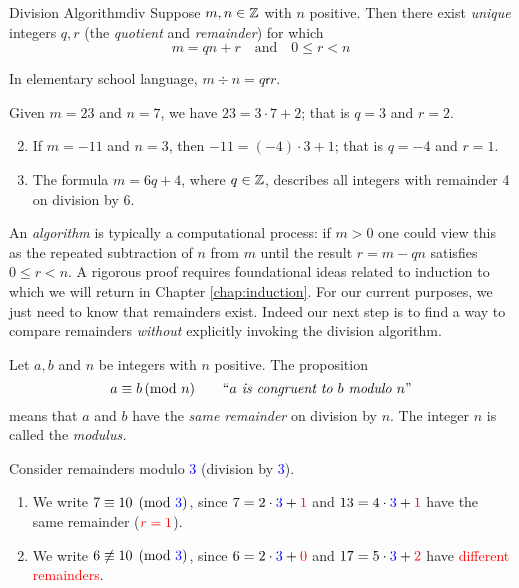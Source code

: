 \begin{thm}{Division Algorithm}{div}
	Suppose $m,n\in\mathbb{Z}$ with $n$ positive. Then there exist \emph{unique} integers $q,r$ (the \emph{quotient} and \emph{remainder}) for which
	\[
		m=qn+r\quad\text{and}\quad 0\le r<n
	\]
\end{thm}


In elementary school language, $m\div n=q\mathbin{\mathsf r}r$.

\begin{examples}{}{}
	\exstart Given $m=23$ and $n=7$, we have $23=3\cdot 7+2$; that is $q=3$ and $r=2$.
	\begin{enumerate}\setcounter{enumi}{1}
		\item If $m=-11$ and $n=3$, then $-11=(-4)\cdot 3+1$; that is $q=-4$ and $r=1$.
		\item The formula $m=6q+4$, where $q\in\mathbb{Z}$, describes all integers with remainder 4 on division by 6.
	\end{enumerate}
\end{examples}

An \emph{algorithm} is typically a computational process: if $m>0$ one could view this as the repeated subtraction of $n$ from $m$ until the result $r=m-qn$ satisfies $0\le r<n$. A rigorous proof requires foundational ideas related to induction to which we will return in Chapter \ref{chap:induction}. For our current purposes, we just need to know that remainders exist. Indeed our next step is to find a way to compare remainders \emph{without} explicitly invoking the division algorithm.


\begin{defn}{}{}
	Let $a,b$ and $n$ be integers with $n$ positive. The proposition
	\[
		a\equiv b\negthickspace\pmod{n}\qquad \text{``\emph{$a$ is congruent to $b$ modulo $n$}''}
	\]
	means that $a$ and $b$ have the \emph{same remainder} on division by $n$. The integer $n$ is called the \emph{modulus.}
\end{defn}

\begin{examples}{}{}
	Consider remainders modulo \textcolor{blue}{3} (division by \textcolor{blue}{3}).
	\begin{enumerate}\itemsep1pt
	  \item We write $7\equiv 10\pmod{\textcolor{blue}{3}}$, since $7=2\cdot \textcolor{blue}{3}+\textcolor{red}{1}$ and $13=4\cdot \textcolor{blue}{3}+\textcolor{red}{1}$ have the same remainder ($\textcolor{red}{r=1}$).
	  \item We write $6\not\equiv 10\pmod{\textcolor{blue}{3}}$, since $6=2\cdot\textcolor{blue}{3}+\textcolor{red}{0}$ and $17=5\cdot\textcolor{blue}{3}+\textcolor{red}{2}$ have \textcolor{red}{different remainders}.
	\end{enumerate}
\end{examples}


